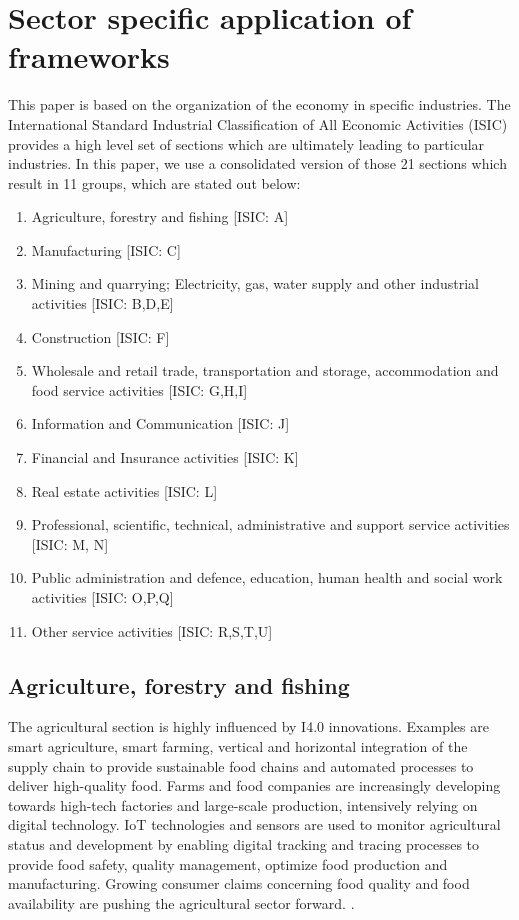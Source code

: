 \section{Sector specific application of frameworks}

This paper is based on the organization of the economy in specific industries. The International Standard Industrial Classification of All Economic Activities (\ac{ISIC}) provides a high level set of sections which are ultimately leading to particular industries. In this paper, we use a consolidated version of those 21 sections which result in 11 groups, which are stated out below: \cite[p.271, table 4]{ISIC:2008}

\begin{enumerate}
\item Agriculture, forestry and fishing [ISIC: A]
\item Manufacturing [ISIC: C]
\item Mining and quarrying; Electricity, gas, water supply and other industrial activities [ISIC: B,D,E]
\item Construction [ISIC: F]
\item Wholesale and retail trade, transportation and storage, accommodation and food service activities [ISIC: G,H,I]
\item Information and Communication [ISIC: J]
\item Financial and Insurance activities [ISIC: K]
\item Real estate activities [ISIC: L]
\item Professional, scientific, technical, administrative and support service activities [ISIC: M, N]
\item Public administration and defence, education, human health and social work activities [ISIC: O,P,Q]
\item Other service activities [ISIC: R,S,T,U]
\end{enumerate}

\subsection{Agriculture, forestry and fishing}

The agricultural section is highly influenced by \ac{I4.0} innovations. Examples are smart agriculture, smart farming, vertical and horizontal integration of the supply chain to provide sustainable food chains and automated processes to deliver high-quality food. Farms and food companies are increasingly developing towards high-tech factories and large-scale production, intensively relying on digital technology. \cite[p.129-151]{FoodAndFarm2020} \ac{IoT} technologies and sensors are used to monitor agricultural status and development by enabling digital tracking and tracing processes to provide food safety, quality management, optimize food production and manufacturing. Growing consumer claims concerning food quality and food availability are pushing the agricultural sector forward. \cite[p.131]{FoodAndFarm2020}.


